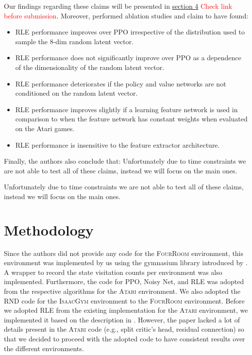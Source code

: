 \documentclass[10pt]{article} %
\begin{document}
\noindent Our findings regarding these claims will be presented in \hyperlink{sec4}{section 4} \textcolor{red}{Check link before submission}. Moreover, \cite{rle-paper} performed ablation studies and claim to have found:

\begin{itemize}
  \item RLE performance improves over PPO irrespective of the distribution used to sample the 8-dim random latent vector.
  \item RLE performance does not significantly improve over PPO as a dependence of the dimensionality of the random latent vector.
  \item RLE performance deteriorates if the policy and value networks are not conditioned on the random latent vector.
  \item RLE performance improves slightly if a learning feature network is used in comparison to when the feature network has constant weights when evaluated on the Atari games.
  \item RLE performance is insensitive to the feature extractor architecture.
\end{itemize}

\noindent Finally, the authors also conclude that: \noindent Unfortunately due to time constraints we are not able to test all of these claims, instead we will focus on the main ones.

\noindent Unfortunately due to time constraints we are not able to test all of these claims, instead we will focus on the main ones.

\section{Methodology}
Since the authors did not provide any code for the \textsc{FourRoom} environment, this environment was implemented by us using the gymnasium library introduced by \cite{gymnasium-paper}. A wrapper to record the state visitation counts per environment was also implemented. Furthermore, the code for PPO, Noisy Net, and RLE was adopted from the respective algorithms for the \textsc{Atari} environment. We also adopted the RND code for the \textsc{IsaacGym} environment to the \textsc{FourRoom} environment. Before we adopted RLE from the existing implementation for the \textsc{Atari} environment, we implemented it based on the description in \cite{rle-paper}. However, the paper lacked a lot of details present in the \textsc{Atari} code (e.g., split critic's head, residual connection) so that we decided to proceed with the adopted code to have consistent results over the different environments.
\end{document}
